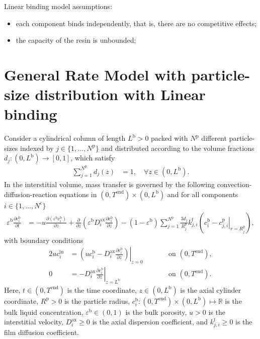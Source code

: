 \documentclass{article}
\begin{document}
Linear binding model assumptions:
\begin{itemize}
    \item each component binds independently, that is, there are no competitive effects;
    \item the capacity of the resin is unbounded;
\end{itemize}

\section*{General Rate Model with particle-size distribution with Linear binding}
Consider a cylindrical column of length $L^{\mathrm{b}} > 0$ packed with $N^{\mathrm{p}}$ different particle-sizes indexed by $j \in \{1, \dots, N^{\mathrm{p}}\}$ and distributed according to the volume fractions $d_{j} \colon (0, L^{\mathrm{b}}) \to [0, 1]$, which satisfy
\begin{align}
    \sum_{j=1}^{N^{\mathrm{p}}} d_{j}(z)
    &= 1, \quad \forall z \in (0, L^{\mathrm{b}}).
\end{align}
In the interstitial volume, mass transfer is governed by the following convection-diffusion-reaction equations in $(0, T^{\mathrm{end}})\times (0, L^{\mathrm{b}})$ and for all components $i\in\{1, \dots, N^{\mathrm{c}} \}$
\begin{align}
    \varepsilon^{\mathrm{b}} \frac{\partial c^{\mathrm{b}}_{i}}{\partial t}
    &= - u \frac{\partial \left( \varepsilon^{\mathrm{b}} c^{\mathrm{b}}_{i} \right)}{\partial z}
        + \frac{\partial}{\partial z} \left( \varepsilon^{\mathrm{b}} D^{\mathrm{ax}}_{i} \frac{\partial c^{\mathrm{b}}_{i}}{\partial z} \right)
        - \left(1 - \varepsilon^{\mathrm{b}} \right) \sum_{j=1}^{N^{\mathrm{p}}} \frac{3d_{j}}{R^{\mathrm{p}}_{j}} k^{\mathrm{f}}_{j,i} \left(c^{\mathrm{b}}_{i} - \left. c^{\mathrm{p}}_{j,i} \right|_{r = R^{\mathrm{p}}_{j}} \right),
\end{align}
with boundary conditions
\begin{alignat}{2}
    u c^{\mathrm{in}}_{i}
    &= \left.\left( u c^{\mathrm{b}}_{i} - D^{\mathrm{ax}}_{i} \frac{\partial c^{\mathrm{b}}_{i}}{\partial z}\right)\right|_{z=0}
    & & \qquad\text{on }(0, T^{\mathrm{end}}),
    \\
    0
    &= - D^{\mathrm{ax}}_{i} \left. \frac{\partial c^{\mathrm{b}}_{i}}{\partial z} \right|_{z=L^{\mathrm{b}}}
    & & \qquad\text{on }(0, T^{\mathrm{end}}).
\end{alignat}
Here, $t\in (0, T^{\mathrm{end}})$ is the time coordinate, $z\in (0, L^{\mathrm{b}})$ is the axial cylinder coordinate, $R^{\mathrm{p}}> 0$ is the particle radius, $c^{\mathrm{b}}_{i}\colon (0, T^{\mathrm{end}})\times (0, L^{\mathrm{b}}) \mapsto \mathbb{R}$ is the bulk liquid concentration, $\varepsilon^{\mathrm{b}}\in (0, 1)$ is the bulk porosity, $u> 0$ is the interstitial velocity, $D^{\mathrm{ax}}_{i}\geq 0$ is the axial dispersion coefficient, and $k^{\mathrm{f}}_{j,i}\geq 0$ is the film diffusion coefficient.
\end{document}
